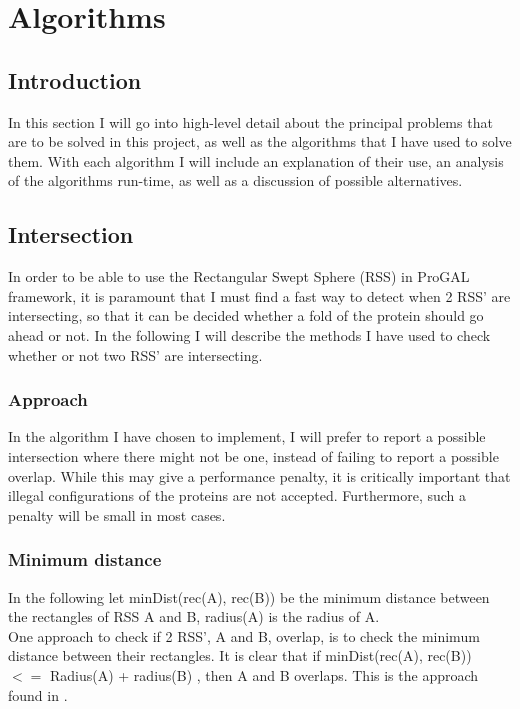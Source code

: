
\section{Algorithms}
\label{algorithms}
\subsection{Introduction}
In this section I will go into high-level detail about the principal problems that are to be solved in this project, as well as the algorithms that I have used to solve them. With each algorithm I will include an explanation of their use, an analysis of the algorithms run-time, as well as a discussion of possible alternatives. 

\subsection{Intersection}
\label{intersection}
In order to be able to use the Rectangular Swept Sphere (RSS) in ProGAL framework, it is paramount that I must find a fast way to detect when 2 RSS' are intersecting, so that it can be decided whether a fold of the protein should go ahead or not. In the following I will describe the methods I have used to check whether or not two RSS' are intersecting.

\subsubsection{Approach}
In the algorithm I have chosen to implement, I will prefer to report a possible intersection where there might not be one, instead of failing to report a possible overlap. While this may give a performance penalty, it is critically important that illegal configurations of the proteins are not accepted. Furthermore, such a penalty will be small in most cases.

\subsubsection{Minimum distance}
In the following let minDist(rec(A), rec(B)) be the minimum distance between the rectangles of RSS A and B, radius(A) is the radius of A.\\

One approach to check if 2 RSS', A and B, overlap, is to check the minimum distance between their rectangles. It is clear that if minDist(rec(A), rec(B)) $<=$ Radius(A) + radius(B) , then A and B overlaps. This is the approach found in \cite{Larsen99fastproximity}.

